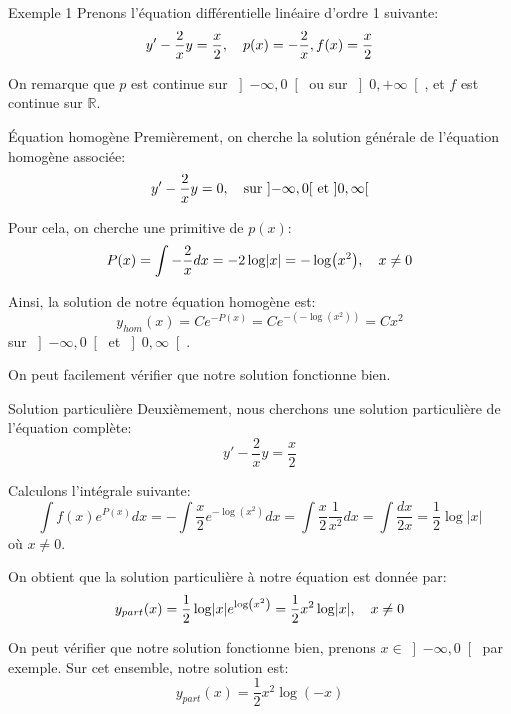 \documentclass[a4paper]{article}
\begin{document}
\begin{parag}{Exemple 1}
    Prenons l'équation différentielle linéaire d'ordre 1 suivante: 
    \[y' - \frac{2}{x} y = \frac{x}{2}, \mathspace p\left(x\right) = -\frac{2}{x}, f\left(x\right) = \frac{x}{2}\]
    
    On remarque que $p$ est continue sur $\left]-\infty, 0\right[$ ou sur $\left]0, +\infty\right[ $, et $f$ est continue sur $\mathbb{R}$.

    \begin{subparag}{Équation homogène}
        Premièrement, on cherche la solution générale de l'équation homogène associée: 
        \[y' - \frac{2}{x}y = 0, \mathspace \text{sur } \left]-\infty, 0\right[ \text{ et } \left]0, \infty\right[ \]
        
        Pour cela, on cherche une primitive de $p\left(x\right)$: 
        \[P\left(x\right) = \int -\frac{2}{x} dx = -2 \log\left|x\right| = -\log\left(x^2\right), \mathspace x\neq 0\]
        
        Ainsi, la solution de notre équation homogène est: 
        \[y_{hom}\left(x\right) = Ce^{-P\left(x\right)} = Ce^{-\left(-\log\left(x^2\right)\right)} = Cx^2\]
        sur $\left]-\infty, 0\right[$ et $\left]0, \infty\right[$.

        On peut facilement vérifier que notre solution fonctionne bien.
    \end{subparag}

    \begin{subparag}{Solution particulière}
        Deuxièmement, nous cherchons une solution particulière de l'équation complète: 
        \[y' - \frac{2}{x} y = \frac{x}{2}\]
        
        Calculons l'intégrale suivante: 
        \[\int f\left(x\right) e^{P\left(x\right)}dx = - \int \frac{x}{2} e^{- \log\left(x^2\right)} dx = \int \frac{x}{2} \frac{1}{x^2} dx = \int \frac{dx}{2x} = \frac{1}{2} \log\left|x\right|\]
        où $x \neq 0$.
        
        On obtient que la solution particulière à notre équation est donnée par: 
        \[y_{part}\left(x\right) = \frac{1}{2} \log\left|x\right| e^{\log\left(x^2\right)} = \frac{1}{2}x^2 \log\left|x\right|, \mathspace x \neq 0\]
        
        On peut vérifier que notre solution fonctionne bien, prenons $x \in \left]-\infty, 0\right[ $ par exemple. Sur cet ensemble, notre solution est:
        \[y_{part}\left(x\right) = \frac{1}{2}x^2 \log\left(-x\right)\]
        

\end{subparag}
\end{parag}
\end{document}
